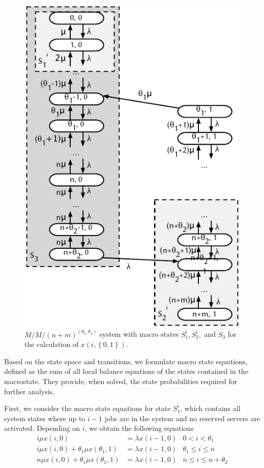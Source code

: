 \begin{figure}
  \centering
  \includegraphics{cloud/data_centers/modeling/figures/state_diagram}
  \caption{\(M/M/(n+m)^{(\theta_1, \theta_2)}\) system with macro states \(S_1^i, S_2^i,\) and \(S_3\) for the calculation of \(x(i, \left\{0, 1\right\})\).}
  \label{fig:cloud:data_centers:modeling:energy_efficient:state_diagram}
\end{figure}

Based on the state space and transitions, we formulate macro state equations, defined as the sum of all local balance equations of the states contained in the macrostate.
They provide, when solved, the state probabilities required for further analysis. 

First,  we consider the macro state equations for state \(S_1^i\), which contains all system states where up to \(i-1\) jobs are in the system and no reserved servers are activated.
Depending on \(i\), we obtain the following equations
\begin{align}
i\mu x(i,0) &= \lambda x(i-1, 0) & 0<i<\theta_1\label{eq:cloud:data_centers:modeling:energy_efficient:S1_1}\\
i\mu x(i,0) + \theta_1 \mu x(\theta_1,1) &= \lambda x(i-1,0) & \theta_1\leq i\leq n\label{eq:cloud:data_centers:modeling:energy_efficient:S1_2}\\
n\mu x(i,0) + \theta_1 \mu x(\theta_1,1) &= \lambda x(i-1,0) & n\leq i\leq n+\theta_2\label{eq:cloud:data_centers:modeling:energy_efficient:S1_3}
\end{align}

